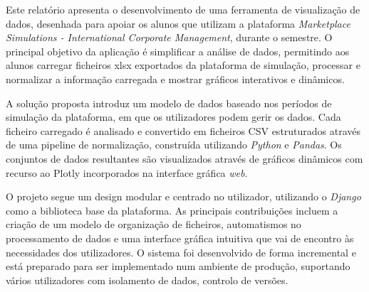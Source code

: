 




Este  relatório apresenta o desenvolvimento de uma ferramenta de visualização de dados, desenhada para apoiar os alunos que utilizam a  plataforma \textit{Marketplace Simulations - International Corporate Management}, durante o semestre. O principal objetivo da aplicação é simplificar a análise de dados, permitindo aos alunos carregar ficheiros \gls{xlsx} exportados da plataforma de simulação, processar e normalizar a informação carregada e mostrar gráficos interativos e dinâmicos.

A solução proposta introduz um modelo de dados baseado nos períodos de simulação da plataforma, em que os utilizadores podem gerir os dados. Cada ficheiro carregado é analisado e convertido em ficheiros CSV estruturados através de uma pipeline de normalização, construída utilizando \textit{Python} e \textit{Pandas}. Os conjuntos de dados resultantes são visualizados através de gráficos dinâmicos com recurso ao Plotly incorporados na interface gráfica \textit{web}.

O projeto segue um design modular e centrado no utilizador, utilizando o \textit{Django} como a biblioteca base da plataforma. As principais contribuições incluem a criação de um modelo de organização de ficheiros, automatismos no processamento de dados e uma interface gráfica intuitiva que vai de encontro às necessidades dos utilizadores. O sistema foi desenvolvido de forma incremental e está preparado para ser implementado num ambiente de produção, suportando vários utilizadores com isolamento de dados, controlo de versões.




